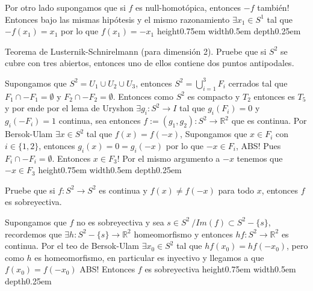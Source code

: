 \documentclass[11pt]{article}
\newcommand{\R}{{\mathbb{R}}}
\newenvironment{proof}[1][Demostraci\'on]{\begin{trivlist}
\item[\hskip \labelsep {\bfseries #1}]}{\end{trivlist}}
\newcommand{\qed}{\nobreak \ifvmode \relax \else
      \ifdim\lastskip<1.5em \hskip-\lastskip
      \hskip1.5em plus0em minus0.5em \fi \nobreak
      \vrule height0.75em width0.5em depth0.25em\fi}
\begin{document}
\begin{enumerate}
\begin{proof}
Por otro lado supongamos que si $f$ es null-homot\'opica, entonces $-f$ tambi\'en! Entonces bajo las mismas hip\'otesis y el mismo razonamiento $\exists x_1 \in S^1$ tal que $-f(x_1)=x_1$ por lo que $f(x_1) = -x_1$ \qed

\end{proof}

\item {Teorema de Lusternik-Schnirelmann (para dimensi\'on 2). Pruebe que si $S^2$ se cubre con tres abiertos, entonces uno de ellos contiene dos puntos antipodales.
}

\begin{proof}

Supongamos que $S^2 = U_1 \cup U_2\cup U_3$, entonces $S^2 = \bigcup_{i=1}^{3}{F_i}$ cerrados tal que $F_1 \cap -F_1 = \emptyset$ y $F_2 \cap -F_2 = \emptyset$. Entonces como $S^2$ es compacto y $T_2$ entonces es $T_5$ y por ende por el lema de Uryshon $\exists g_i : S^2 \rightarrow I$ tal que $g_i(F_i)=0$ y $g_i(-F_i)=1$ continua, sea entonces $f:=(g_1,g_2):S^2 \rightarrow \R^2$ que es continua. Por Bersok-Ulam $\exists x \in S^2$ tal que $f(x)=f(-x)$, Supongamos que $x \in F_i$ con $i \in \{1,2\}$, entonces $g_i(x)=0=g_i(-x)$ por lo que $-x \in F_i$, ABS! Pues $F_i \cap -F_i = \emptyset$. Entonces $x \in F_3$! Por el mismo argumento a $-x$ tenemos que $-x \in F_3$ \qed

\end{proof}

\item {Pruebe que si $f:S^2\to S^2$ es continua y $f(x)\neq f(-x)$ para todo $x$, entonces $f$ es sobreyectiva.}

\begin{proof}

Supongamos que $f$ no es sobreyectiva y sea $s \in S^2 \ / Im(f)\subset S^2 - \{s\}$, recordemos que $\exists h:S^2-\{s\} \rightarrow \R^2$ homeomorfismo y entonces $hf:S^2 \rightarrow \R^2$ es continua. Por el teo de Bersok-Ulam $\exists x_0 \in S^2$ tal que $hf(x_0)=hf(-x_0)$, pero como $h$ es homeomorfismo, en particular es inyectivo y llegamos a que $f(x_0)=f(-x_0)$ ABS! Entonces $f$ es sobreyectiva \qed

\end{proof}


\end{enumerate}
\end{document}
